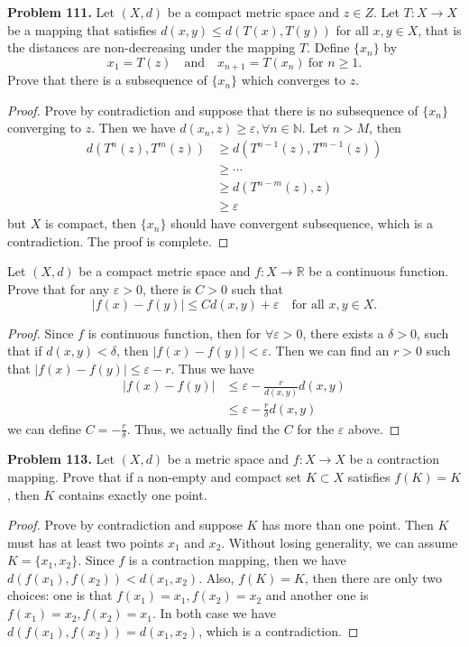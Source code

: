 \documentclass[12pt,leqno]{amsart}
\theoremstyle{definition}
\numberwithin{equation}{subsection}
\begin{document}
\medskip


\noindent
{\bf Problem 111.}
Let $(X,d)$ be a compact metric space and $z\in Z$. Let $T:X\to X$ be a mapping that satisfies $d(x,y)\leq d(T(x),T(y))$ for all $x,y\in X$, that is the distances are non-decreasing under the mapping $T$. Define $\{x_n\}$ by
$$
x_1=T(z)
\quad
\text{and}
\quad
x_{n+1}=T(x_n) \ \text{for $n\geq 1$.}
$$
Prove that there is a subsequence of $\{ x_n\}$ which converges to $z$.
\begin{proof}
Prove by contradiction and suppose that there is no subsequence of $\{ x_n\}$  converging to $z$. Then we have $d(x_n, z) \geq \varepsilon, \forall n\in\mathbb{N}$. Let $n > M$, then 
\begin{align*}
    d\left(T^{n}(z), T^{m}(z)\right) & \geq d\left(T^{n-1}(z), T^{m-1}(z)\right) \\
    & \geq \cdots \\
    & \geq d\left(T^{n-m}(z), z\right) \\
    & \geq \varepsilon
\end{align*}
but $X$ is compact, then $\{x_n\}$ should have convergent subsequence, which is a  contradiction. The proof is complete.
\end{proof}

\medskip


Let $(X,d)$ be a compact metric space and $f:X\to\mathbb{R}$ be a continuous function. Prove that for any $\varepsilon>0$, there is $C>0$ such that
$$
|f(x)-f(y)|\leq Cd(x,y)+\varepsilon
\quad
\text{for all $x,y\in X$.}
$$
\begin{proof}
Since $f$ is continuous function, then for $\forall\varepsilon > 0$, there exists a $\delta > 0$, such that if $d(x,y) < \delta$, then $\left|f(x) - f(y)\right| < \varepsilon$. Then we can find an $r > 0$ such that $\left|f(x) - f(y)\right| \leq \varepsilon - r$. Thus we have
\begin{align*}
    \left|f(x) - f(y)\right| & \leq \varepsilon - \frac{r}{d(x,y)}d(x,y) \\
    & \leq \varepsilon - \frac{r}{\delta}d(x,y)
\end{align*}
we can define $C = - \frac{r}{\delta}$. Thus, we actually find the $C$ for the $\varepsilon$ above.
\end{proof}

\medskip


\noindent
{\bf Problem 113.}
Let $(X,d)$ be a metric space and $f:X\to X$ be a contraction mapping. Prove that if a non-empty and compact set $K\subset X$ satisfies $f(K)=K$, then $K$ contains exactly one point.
\begin{proof}
Prove by contradiction and suppose $K$ has more than one point. Then $K$ must has at least two points $x_1$ and $x_2$. Without losing generality, we can assume $K = \{x_1, x_2\}$. Since $f$ is a contraction mapping, then we have $d(f(x_1),f(x_2)) < d(x_1,x_2)$. Also, $f(K) = K$, then there are only two choices: one is that $f(x_1) = x_1, f(x_2) = x_2$ and another one is $f(x_1) = x_2, f(x_2) = x_1$. In both case we have $d(f(x_1),f(x_2)) = d(x_1,x_2)$, which is a contradiction.
\end{proof}
\end{document}
